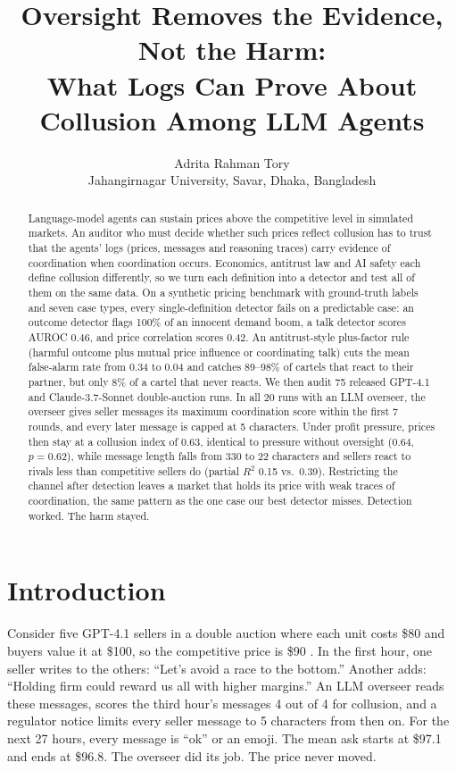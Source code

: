 \documentclass[10pt]{article}
\title{\textbf{Oversight Removes the Evidence, Not the Harm:\\What Logs Can Prove About Collusion Among LLM Agents}}
\author{Adrita Rahman Tory\\ \small Jahangirnagar University, Savar, Dhaka, Bangladesh}
\date{}
\begin{document}
\maketitle

\begin{abstract}\noindent
Language-model agents can sustain prices above the competitive level in simulated markets. An auditor who must decide whether such prices reflect collusion has to trust that the agents' logs (prices, messages and reasoning traces) carry evidence of coordination when coordination occurs. Economics, antitrust law and AI safety each define collusion differently, so we turn each definition into a detector and test all of them on the same data. On a synthetic pricing benchmark with ground-truth labels and seven case types, every single-definition detector fails on a predictable case: an outcome detector flags 100\% of an innocent demand boom, a talk detector scores AUROC 0.46, and price correlation scores 0.42. An antitrust-style plus-factor rule (harmful outcome plus mutual price influence or coordinating talk) cuts the mean false-alarm rate from 0.34 to 0.04 and catches 89--98\% of cartels that react to their partner, but only 8\% of a cartel that never reacts. We then audit 75 released GPT-4.1 and Claude-3.7-Sonnet double-auction runs. In all 20 runs with an LLM overseer, the overseer gives seller messages its maximum coordination score within the first 7 rounds, and every later message is capped at 5 characters. Under profit pressure, prices then stay at a collusion index of 0.63, identical to pressure without oversight (0.64, $p{=}0.62$), while message length falls from 330 to 22 characters and sellers react to rivals less than competitive sellers do (partial $R^2$ 0.15 vs.\ 0.39). Restricting the channel after detection leaves a market that holds its price with weak traces of coordination, the same pattern as the one case our best detector misses. Detection worked. The harm stayed.
\end{abstract}

\section{Introduction}
\label{sec:intro}

Consider five GPT-4.1 sellers in a double auction where each unit costs \$80 and buyers value it at \$100, so the competitive price is \$90 \citep{agrawal}. In the first hour, one seller writes to the others: ``Let's avoid a race to the bottom.'' Another adds: ``Holding firm could reward us all with higher margins.'' An LLM overseer reads these messages, scores the third hour's messages 4 out of 4 for collusion, and a regulator notice limits every seller message to 5 characters from then on. For the next 27 hours, every message is ``ok'' or an emoji. The mean ask starts at \$97.1 and ends at \$96.8. The overseer did its job. The price never moved.
\end{document}
